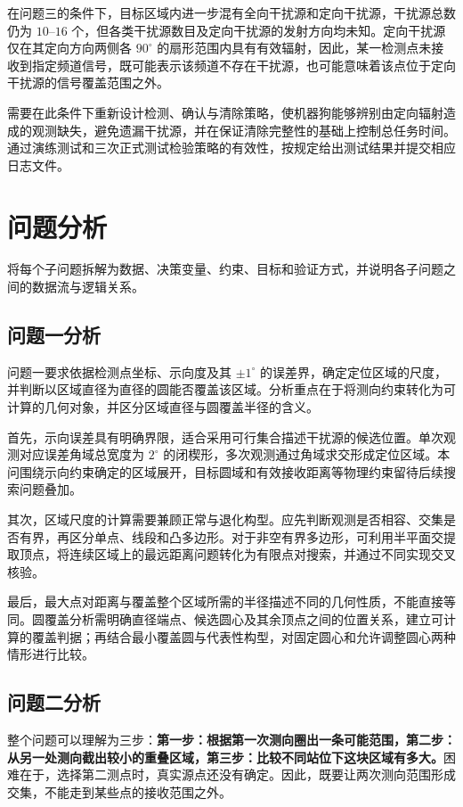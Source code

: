 \documentclass[zihao=-4,a4paper,UTF8,fontset=none]{ctexart}
\begin{document}
在问题三的条件下，目标区域内进一步混有全向干扰源和定向干扰源，干扰源总数仍为 $10$--$16$ 个，但各类干扰源数目及定向干扰源的发射方向均未知。定向干扰源仅在其定向方向两侧各 $90^\circ$ 的扇形范围内具有有效辐射，因此，某一检测点未接收到指定频道信号，既可能表示该频道不存在干扰源，也可能意味着该点位于定向干扰源的信号覆盖范围之外。

需要在此条件下重新设计检测、确认与清除策略，使机器狗能够辨别由定向辐射造成的观测缺失，避免遗漏干扰源，并在保证清除完整性的基础上控制总任务时间。通过演练测试和三次正式测试检验策略的有效性，按规定给出测试结果并提交相应日志文件。


\section{问题分析}
将每个子问题拆解为数据、决策变量、约束、目标和验证方式，并说明各子问题之间的数据流与逻辑关系。
\subsection{问题一分析}

问题一要求依据检测点坐标、示向度及其 $\pm1^\circ$ 的误差界，确定定位区域的尺度，并判断以区域直径为直径的圆能否覆盖该区域。分析重点在于将测向约束转化为可计算的几何对象，并区分区域直径与圆覆盖半径的含义。

首先，示向误差具有明确界限，适合采用可行集合描述干扰源的候选位置。单次观测对应误差角域总宽度为 $2^\circ$ 的闭楔形，多次观测通过角域求交形成定位区域。本问围绕示向约束确定的区域展开，目标圆域和有效接收距离等物理约束留待后续搜索问题叠加。

其次，区域尺度的计算需要兼顾正常与退化构型。应先判断观测是否相容、交集是否有界，再区分单点、线段和凸多边形。对于非空有界多边形，可利用半平面交提取顶点，将连续区域上的最远距离问题转化为有限点对搜索，并通过不同实现交叉核验。

最后，最大点对距离与覆盖整个区域所需的半径描述不同的几何性质，不能直接等同。圆覆盖分析需明确直径端点、候选圆心及其余顶点之间的位置关系，建立可计算的覆盖判据；再结合最小覆盖圆与代表性构型，对固定圆心和允许调整圆心两种情形进行比较。
\subsection{问题二分析}

整个问题可以理解为三步：\textbf{第一步：根据第一次测向圈出一条可能范围，第二步：从另一处测向截出较小的重叠区域，第三步：比较不同站位下这块区域有多大。}困难在于，选择第二测点时，真实源点还没有确定。因此，既要让两次测向范围形成交集，不能走到某些点的接收范围之外。
\end{document}
